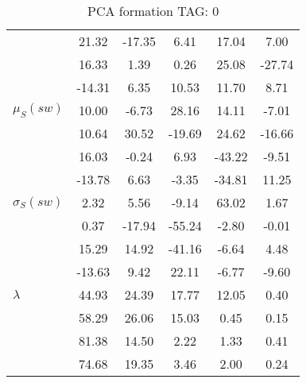\begin{table}[h!]
\begin{center}
\begin{tabular}{| l || c | c | c | c | c |}
 & 21.32  & -17.35  & 6.41  & 17.04  & 7.00 \\
 & 16.33  & 1.39  & 0.26  & 25.08  & -27.74 \\
 & -14.31  & 6.35  & 10.53  & 11.70  & 8.71 \\\hline
$\mu_S(sw)$ & 10.00  & -6.73  & 28.16  & 14.11  & -7.01 \\
 & 10.64  & 30.52  & -19.69  & 24.62  & -16.66 \\
 & 16.03  & -0.24  & 6.93  & -43.22  & -9.51 \\
 & -13.78  & 6.63  & -3.35  & -34.81  & 11.25 \\\hline
$\sigma_S(sw)$ & 2.32  & 5.56  & -9.14  & 63.02  & 1.67 \\
 & 0.37  & -17.94  & -55.24  & -2.80  & -0.01 \\
 & 15.29  & 14.92  & -41.16  & -6.64  & 4.48 \\
 & -13.63  & 9.42  & 22.11  & -6.77  & -9.60 \\\hline\hline
$\lambda$ & 44.93  & 24.39  & 17.77  & 12.05  & 0.40 \\
 & 58.29  & 26.06  & 15.03  & 0.45  & 0.15 \\
 & 81.38  & 14.50  & 2.22  & 1.33  & 0.41 \\
 & 74.68  & 19.35  & 3.46  & 2.00  & 0.24 \\\hline
\end{tabular}
\caption{PCA formation TAG: 0}
\end{center}
\end{table}